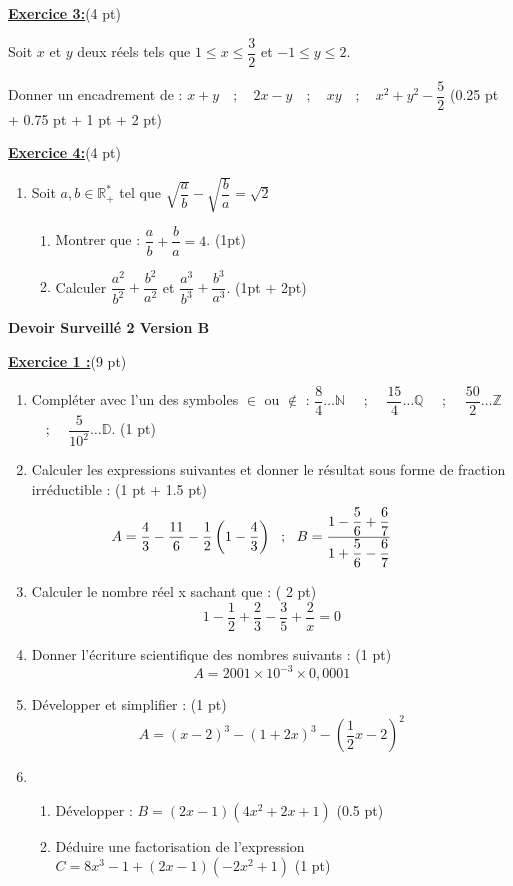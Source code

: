 \documentclass[12pt,a4paper]{article}
\begin{document}
\underline{\large\textbf{Exercice  3:}}(4 pt)

Soit $x$ et $y$ deux réels tels que $1\leq x\leq \dfrac{3}{2}$ et $-1\leq y\leq 2$.

Donner un encadrement de : $x + y\quad;\quad 2x - y \quad;\quad xy \quad;\quad x^2 + y^2 - \dfrac{5}{2}$ (0.25 pt + 0.75 pt + 1 pt + 2 pt)

\underline{\large\textbf{Exercice  4:}}(4 pt)
\begin{enumerate}
	\item Soit $a,b\in\mathbb{R}^*_+$ tel que $\sqrt{\dfrac{a}{b}} - \sqrt{\dfrac{b}{a}} = \sqrt{2}$
   	\begin{enumerate}
   		\item Montrer que : $\dfrac{a}{b} + \dfrac{b}{a} = 4$. (1pt)
   		\item Calculer $\dfrac{a^2}{b^2} + \dfrac{b^2}{a^2}$ et $\dfrac{a^3}{b^3} + \dfrac{b^3}{a^3}$. (1pt + 2pt)
   	\end{enumerate}
\end{enumerate}




\begin{center}
    \textbf{\Large  Devoir Surveillé 2 Version B}
\end{center}

\underline{\large\textbf{Exercice 1 :}}(9 pt)
\begin{enumerate}
   \item Compléter avec l'un des symboles $\in$ ou $\not\in$ : $\dfrac{8}{4}\dots \mathbb{N}$ \ \ ; \ \ $\dfrac{15}{4}\dots \mathbb{Q}$ \ \ ; \ \ $\dfrac{50}{2}\dots \mathbb{Z}$ \ \ ; \ \ $\dfrac{5}{10^{2}}\dots \mathbb{D}$. (1 pt)
   \item Calculer les expressions suivantes et donner le résultat sous forme de fraction irréductible : (1 pt + 1.5 pt)
   $$\hspace{-10mm} A = \dfrac{4}{3} - \dfrac{11}{6} - \dfrac{1}{2}\left(1 - \dfrac{4}{3}\right)  \ \ ; \ \ B = \dfrac{1 - \dfrac{5}{6} + \dfrac{6}{7}}{1 + \dfrac{5}{6} - \dfrac{6}{7}}$$
   \item Calculer le nombre réel x sachant que : ( 2 pt)
   $$1 - \dfrac{1}{2} + \dfrac{2}{3} - \dfrac{3}{5} + \dfrac{2}{x} = 0$$
   \item Donner l'écriture scientifique des nombres suivants : (1 pt)
   $$A = 2001\times 10^{-3}\times 0,0001$$
   \item Développer et simplifier : (1 pt)
   $$A = (x - 2)^3 - (1 + 2x)^3 - \left(\dfrac{1}{2}x - 2\right)^2$$
   \item 
   		\begin{enumerate}
   			\item Développer : $B = (2x - 1)(4x^2 + 2x + 1)$ (0.5 pt)
   			\item Déduire une factorisation de l'expression $C = 8x^3 - 1 + (2x - 1)(-2x^2 + 1)$ (1 pt)
	    \end{enumerate}
   
\end{enumerate}
\end{document}
